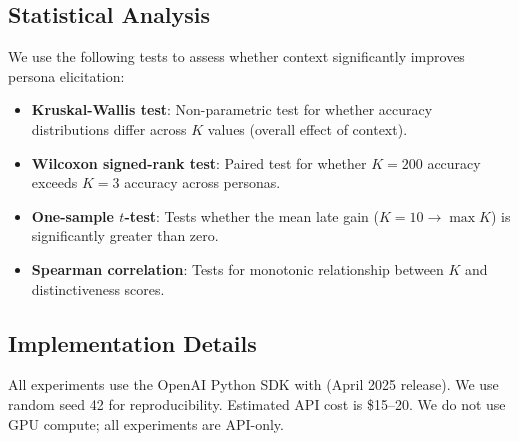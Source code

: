 \subsection{Statistical Analysis}
\label{sec:stats}

We use the following tests to assess whether context significantly improves persona elicitation:

\begin{itemize}[leftmargin=*,itemsep=0pt,topsep=2pt]
    \item \textbf{Kruskal-Wallis test}: Non-parametric test for whether accuracy distributions differ across $K$ values (overall effect of context).
    \item \textbf{Wilcoxon signed-rank test}: Paired test for whether $K{=}200$ accuracy exceeds $K{=}3$ accuracy across personas.
    \item \textbf{One-sample $t$-test}: Tests whether the mean late gain ($K{=}10 \to \max K$) is significantly greater than zero.
    \item \textbf{Spearman correlation}: Tests for monotonic relationship between $K$ and distinctiveness scores.
\end{itemize}

\subsection{Implementation Details}
\label{sec:implementation}

All experiments use the OpenAI Python SDK with \gptmini (April 2025 release). We use random seed 42 for reproducibility. Estimated API cost is \$15--20. We do not use GPU compute; all experiments are API-only.
